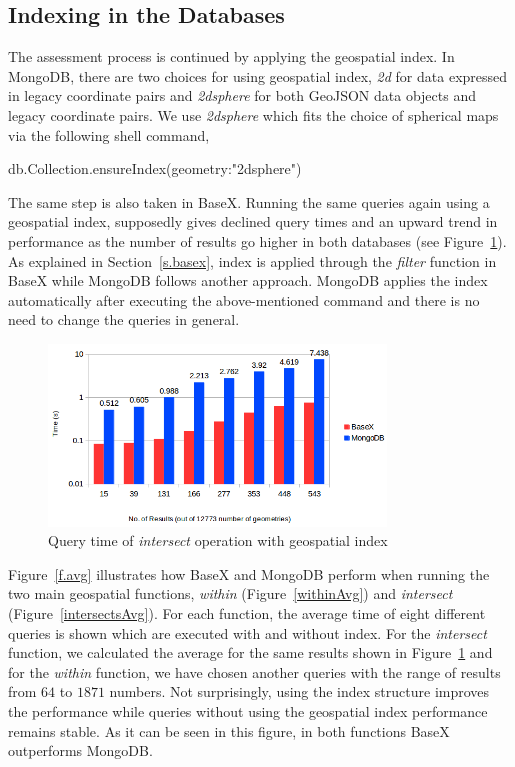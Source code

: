 \documentclass[a4paper,12pt]{article}
\begin{document}
\subsection{Indexing in the Databases}
\label{index}
The assessment process is continued by applying the geospatial index. In MongoDB, there are two choices for using geospatial index, \textit{2d} for data expressed in legacy coordinate pairs and \textit{2dsphere} for both GeoJSON data objects and legacy coordinate pairs. We use \textit{2dsphere} which fits the choice of spherical maps via the following shell command,
\vspace{10px}
\begin{fakeJSON}
db.Collection.ensureIndex({geometry:"2dsphere"}) 
\end{fakeJSON}
\vspace{10px}
The same step is also taken in BaseX. Running the same queries again using a geospatial index, supposedly gives declined query times and an upward trend in performance as the number of results go higher in both databases (see Figure~\ref{figBXvsMongoIndexIntersects}). As explained in Section~\ref{s.basex}, index is applied through the \textit{filter} function in BaseX while MongoDB follows another approach. MongoDB applies the index automatically after executing the above-mentioned command and there is no need to change the queries in general.
\begin{figure}
\centering
\includegraphics[width=0.8\textwidth]{BXvsMongo-Intersects-Index-Sec-log-newColor}
\caption{Query time of \textit{intersect} operation with geospatial index}
\label{figBXvsMongoIndexIntersects}
\end{figure}
Figure~\ref{f.avg} illustrates how BaseX and MongoDB perform when running the two main geospatial functions, \textit{within} (Figure~\ref{withinAvg}) and \textit{intersect} (Figure~\ref{intersectsAvg}). For each function, the average time of eight different queries is shown which are executed with and without index. For the \textit{intersect} function, we calculated the average for the same results shown in Figure~\ref{figBXvsMongoIndexIntersects} and for the \textit{within} function, we have chosen another queries with the range of results from $64$ to $1871$ numbers.
Not surprisingly, using the index structure improves the performance while queries without using the geospatial index performance remains stable. As it can be seen in this figure, in both functions BaseX outperforms MongoDB.
\end{document}
